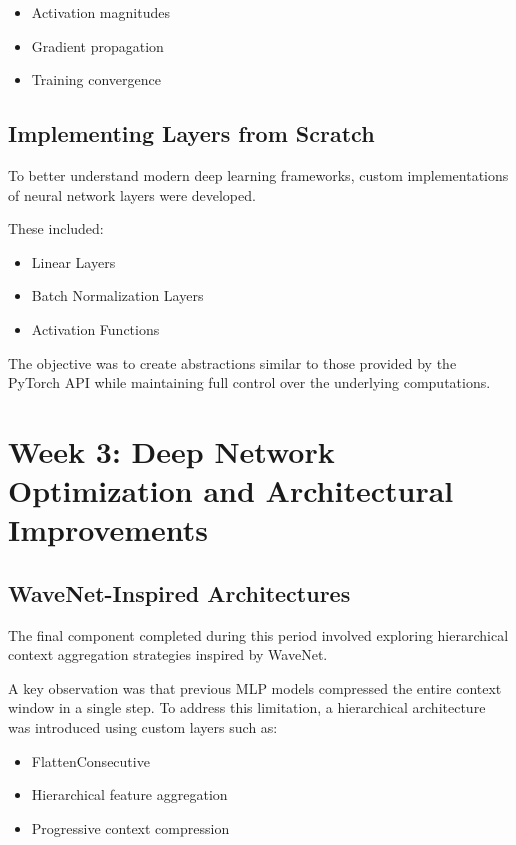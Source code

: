 \documentclass[11pt,a4paper]{article}
\begin{document}
\begin{itemize}
    \item Activation magnitudes
    \item Gradient propagation
    \item Training convergence
\end{itemize}

\subsection{Implementing Layers from Scratch}

To better understand modern deep learning frameworks, custom implementations of neural network layers were developed.

These included:

\begin{itemize}
    \item Linear Layers
    \item Batch Normalization Layers
    \item Activation Functions
\end{itemize}

The objective was to create abstractions similar to those provided by the PyTorch API while maintaining full control over the underlying computations.
\section{Week 3: Deep Network Optimization and Architectural Improvements}

\subsection{WaveNet-Inspired Architectures}

The final component completed during this period involved exploring hierarchical context aggregation strategies inspired by WaveNet.

A key observation was that previous MLP models compressed the entire context window in a single step. To address this limitation, a hierarchical architecture was introduced using custom layers such as:

\begin{itemize}
    \item FlattenConsecutive
    \item Hierarchical feature aggregation
    \item Progressive context compression
\end{itemize}
\end{document}
